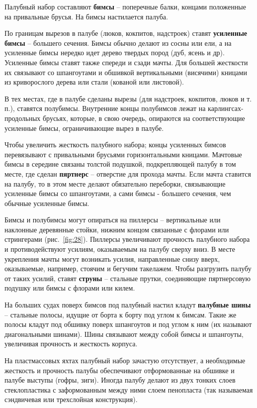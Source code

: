 \documentclass[a4paper, 12pt, twoside, final]{scrbook}
\begin{document}
Палубный набор составляют \textbf{бимсы} \--- поперечные балки, концами
положенные на привальные брусья. На бимсы настилается палуба.

По границам вырезов в палубе (люков, кокпитов, надстроек) ставят \textbf{усиленные
бимсы} \--- большего сечения. Бимсы обычно делают из сосны или ели, а
на усиленные бимсы нередко идет дерево твердых пород (дуб, ясень и
др). Усиленные бимсы ставят также спереди и сзади мачты. Для большей
жесткости их связывают со шпангоутами и обшивкой вертикальными (висячими)
кницами из криворослого дерева или стали (кованой или листовой).

В тех местах, где в палубе сделаны вырезы (для надстроек, кокпитов,
люков и т.\,п.), ставятся полубимсы. Внутренние концы полубимсов лежат
на карлингсах-продольных брусьях, которые, в свою очередь, опираются
на соответствующие усиленные бимсы, ограничивающие вырез в палубе.

Чтобы увеличить жесткость палубного набора; концы усиленных бимсов
перевязывают с привальными брусьями горизонтальными кницами. Мачтовые
бимсы в середине связаны толстой подушкой, подкрепляющей палубу в
том месте, где сделан \textbf{пяртнерс} \--- отверстие для прохода мачты.
Если мачта ставится на палубу, то в этом месте делают обязательно
переборки, связывающие усиленные бимсы со шпангоутами, а сами бимсы
- большего сечения, чем обычные усиленные бимсы.

Бимсы и полубимсы могут опираться на пиллерсы \--- вертикальные или наклонные
деревянные стойки, нижним концом связанные с флорами или стрингерами
(рис.~\ref{fig:28}).
Пиллерсы увеличивают прочность палубного набора и противодействуют
усилиям, оказываемым на палубу сверху вниз. В месте укрепления мачты
могут возникать усилия, направленные снизу вверх, оказываемые, например,
стоячим и бегучим такелажем. Чтобы разгрузить палубу от таких усилий,
ставят \textbf{струны} \--- стальные прутки, соединяющие пяртнерсовую
подушку или бимсы с флорами или килем.

На больших судах поверх бимсов под палубный настил кладут \textbf{палубные
шины} \--- стальные полосы, идущие от борта к борту под углом к бимсам.
Такие же полосы кладут под обшивку поверх шпангоутов и под углом к
ним (их называют диагональными шинами). Шины связывают между собой
бимсы и шпангоуты, увеличивая прочность и жесткость корпуса.

На пластмассовых яхтах палубный набор зачастую отсутствует, а необходимые
жесткость и прочность палубы обеспечивают отформованные на обшивке
и палубе выступы (гофры, зиги). Иногда палубу делают из двух тонких
слоев стеклопластика с заформованным между ними слоем пенопласта (так
называемая сэндвичевая или трехслойная конструкция).
\end{document}
